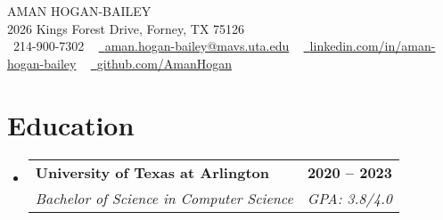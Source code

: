 \documentclass[letterpaper,11pt]{article}
\makeatletter
\newcommand{\resumeSubheading}[4]{
  \vspace{-2pt}\item
    \begin{tabular*}{1.0\textwidth}[t]{l@{\extracolsep{\fill}}r}
      \textbf{#1} & \textbf{\small #2} \\
      \textit{\small#3} & \textit{\small #4} \\
    \end{tabular*}\vspace{-7pt}
}
\newcommand{\resumeSubHeadingListStart}{\begin{itemize}[leftmargin=0.0in, label={}]}
\newcommand{\resumeSubHeadingListEnd}{\end{itemize}}
\makeatother
\begin{document}

\begin{center}
    {\Huge \scshape AMAN HOGAN-BAILEY} \\ \vspace{3pt}
    2026 Kings Forest Drive, Forney, TX 75126 \\ \vspace{3pt}
    \small \raisebox{-0.1\height}\faPhone\ 214-900-7302 ~ \href{mailto:x@gmail.com}{\raisebox{-0.2\height}\faEnvelope\  {aman.hogan-bailey@mavs.uta.edu}} ~ 
    \href{https://www.linkedin.com/in/aman-hogan-bailey/}{\raisebox{-0.2\height}\faLinkedin\ {linkedin.com/in/aman-hogan-bailey}}  ~
    \href{https://github.com/AmanHogan}{\raisebox{-0.2\height}\faGithub\ {github.com/AmanHogan}}
    \vspace{3pt}
\end{center}


\section{Education}
  \resumeSubHeadingListStart
    \resumeSubheading
      {University of Texas at Arlington}{2020 -- 2023}
      {Bachelor of Science in Computer Science}{GPA: 3.8/4.0}
  \resumeSubHeadingListEnd



\end{document}
